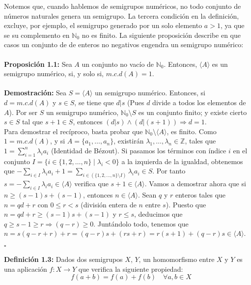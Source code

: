 \documentclass[11pt,spanish]{book}
\newcommand{\qed}{\begin{flushright} $\square$ \end{flushright}}
\begin{document}
Notemos que, cuando hablemos de semigrupos numéricos, no todo conjunto de números naturales genera un semigrupo. La tercera condición en la definición, excluye, por ejemplo, el semigrupo generado por un solo elemento $a>1$, ya que se su complemento en $\mathbb{N}_0$ no es finito. La siguiente proposición describe en que casos un conjunto de de enteros no negativos engendra un semigrupo numérico:\\
\\ \textbf{Proposición 1.1:} Sea $A$ un conjunto no vacío de $\mathbb{N}_0$. Entonces, $\langle A\rangle$ es un semigrupo numérico, si, y solo si, $m.c.d(A)=1$.\\
\\ \textbf{Demostración:}
Sea $S=\langle A\rangle$ un semigrupo numérico. Entonces, si $d=m.c.d(A)$ y $s\in S$, se tiene que $d|s$ (Pues $d$ divide a todos los elementos de $A$). Por ser $S$ un semigrupo numérico, $\mathbb{N}_0\setminus S$ es un conjunto finito; y existe cierto $s\in S$ tal que $s+1\in S$, entonces $(d|s)\land(d|(s+1))\Rightarrow d=1$.\\

Para demostrar el recíproco, basta probar que $\mathbb{N}_0 \setminus\langle A\rangle$, es finito. Como $1=m.c.d(A)$, y si $A=\{a_1,\ldots,a_n\}$, existirán $\lambda_1,\ldots,\lambda_n\in\mathbb{Z}$, tales que $1=\sum_{i=1}^{n}\lambda_{i}a_{i}$ (Identidad de Bézout).
Si pasamos los términos con índice $i$ en el conjunto $I=\{i\in\{1,2,\ldots,n\}\;|\;\lambda_{i}<0\}$ a la izquierda de la igualdad, obtenemos que $-\sum_{i\in I}\lambda_{i}a_{i}+1=\sum_{i\in (\{1,2,\ldots,n\}\setminus I)} \lambda_{i}a_{i}\in S$. Por tanto $s=-\sum_{i\in I}\lambda_{i}a_{i}\in \langle A\rangle$ verifica que $s+1\in \langle A\rangle$. Vamos a demostrar ahora que si $n\geq (s-1)s+(s-1)$, entonces $n\in\langle A\rangle$. Sean $q$ y $r$ enteros tales que $n=qd+r$ con $0\leq r<s$ (división entera de $n$ entre $s$). Puesto que $n=qd+r\geq (s-1)s+(s-1)$ y $r\leq s$, deducimos que $q\geq s-1\geq r\Rightarrow (q-r)\geq 0$. Juntándolo todo, tenemos que $n=s(q-r+r)+r=(q-r)s+(rs+r)=r(s+1)+(q-r)s\in\langle A\rangle$.
\qed
\textbf{Definición 1.3:} Dados dos semigrupos $X$, $Y$, un homomorfismo entre $X$ y $Y$ es una aplicación $f:X\rightarrow Y$ que verifica la siguiente propiedad:\\
$$\quad f(a+b)=f(a)+f(b)\quad \forall a, b\in X$$ 
\end{document}
